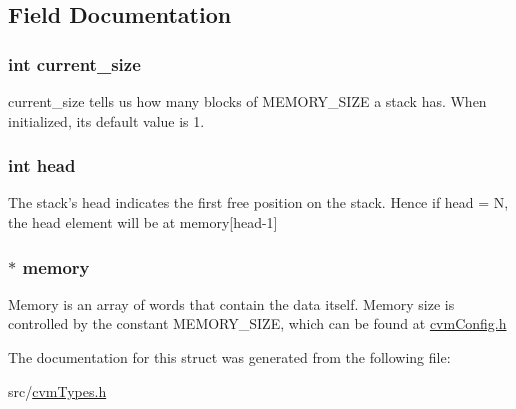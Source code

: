 \subsection{Field Documentation}
\hypertarget{structcvm_stack_afb54d9f9368a5e14e68aa90ba2d53d40}{
\subsubsection[{current\-\_\-size}]{\setlength{\rightskip}{0pt plus 5cm}int current\-\_\-size}}\label{structcvm_stack_afb54d9f9368a5e14e68aa90ba2d53d40}
current\-\_\-size tells us how many blocks of M\-E\-M\-O\-R\-Y\-\_\-\-S\-I\-Z\-E a stack has. When initialized, its default value is 1. \hypertarget{structcvm_stack_a20358970b1abaf992eb85e071e454653}{
\subsubsection[{head}]{\setlength{\rightskip}{0pt plus 5cm}int head}}\label{structcvm_stack_a20358970b1abaf992eb85e071e454653}
The stack's head indicates the first free position on the stack. Hence if head = N, the head element will be at memory\mbox{[}head-\/1\mbox{]} \hypertarget{structcvm_stack_a85478df6a4c8ac08ce55d50177351a65}{
\subsubsection[{memory}]{$\ast$ memory}}\label{structcvm_stack_a85478df6a4c8ac08ce55d50177351a65}
Memory is an array of words that contain the data itself. Memory size is controlled by the constant M\-E\-M\-O\-R\-Y\-\_\-\-S\-I\-Z\-E, which can be found at \hyperlink{cvm_config_8h}{cvm\-Config.\-h} 

The documentation for this struct was generated from the following file\-:\begin{DoxyCompactItemize}
\item 
src/\hyperlink{cvm_types_8h}{cvm\-Types.\-h}\end{DoxyCompactItemize}
